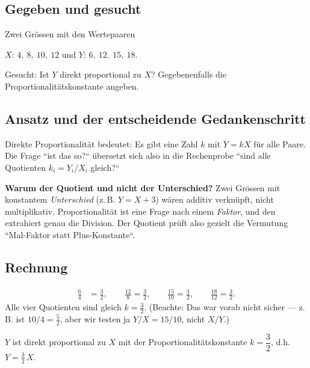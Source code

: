 

\subsection*{Gegeben und gesucht}
Zwei Grössen mit den Wertepaaren

\begin{center}
$X$: $4,\ 8,\ 10,\ 12$ \quad und \quad $Y$: $6,\ 12,\ 15,\ 18$.
\end{center}

Gesucht: Ist $Y$ direkt proportional zu $X$? Gegebenenfalls die
Proportionalitätskonstante angeben.

\subsection*{Ansatz und der entscheidende Gedankenschritt}
Direkte Proportionalität bedeutet: Es gibt eine Zahl $k$ mit $Y=kX$ für
alle Paare. Die Frage ``ist das so?`` übersetzt sich also in die
Rechenprobe ``sind alle Quotienten $k_i=Y_i/X_i$ gleich?``

\textbf{Warum der Quotient und nicht der Unterschied?} Zwei Grössen mit
konstantem \emph{Unterschied} (z.\,B. $Y=X+3$) wären additiv verknüpft,
nicht multiplikativ. Proportionalität ist eine Frage nach einem
\emph{Faktor}, und den extrahiert genau die Division. Der Quotient prüft
also gezielt die Vermutung ``Mal-Faktor statt Plus-Konstante``.

\subsection*{Rechnung}
\begin{align}
  \frac{6}{4}&=\frac32,\qquad \frac{12}{8}=\frac32,\qquad
  \frac{15}{10}=\frac32,\qquad \frac{18}{12}=\frac32 .
\end{align}
Alle vier Quotienten sind gleich $k=\tfrac32$. (Beachte: Das war vorab
nicht sicher --- z.\,B. ist $10/4=\tfrac52$, aber wir testen ja
$Y/X=15/10$, nicht $X/Y$.)

\begin{ergebnis}
$Y$ ist direkt proportional zu $X$ mit der Proportionalitätskonstante
$k=\dfrac32$, d.h. $Y=\tfrac32\,X$.
\end{ergebnis}

